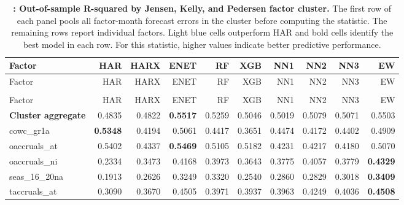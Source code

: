 \begingroup\scriptsize
\captionsetup{justification=raggedright,labelsep=none,singlelinecheck=false,labelformat=boldlabel}
\setlength{\tabcolsep}{2.5pt}
\begin{longtable}{>{\raggedright\arraybackslash}p{2.6cm}rrrrrrrrr}
\caption[Out-of-sample R-squared by Jensen, Kelly, and Pedersen factor cluster.]{\footnotesize \textbf{: Out-of-sample R-squared by Jensen, Kelly, and Pedersen factor cluster.} The first row of each panel pools all factor-month forecast errors in the cluster before computing the statistic. The remaining rows report individual factors. Light blue cells outperform HAR and bold cells identify the best model in each row. For this statistic, higher values indicate better predictive performance.}\label{tab:rv-factor_rss}\\
\hline
Factor & HAR & HARX & ENET & RF & XGB & NN1 & NN2 & NN3 & EW \\
\hline\endfirsthead
\hline
Factor & HAR & HARX & ENET & RF & XGB & NN1 & NN2 & NN3 & EW \\
\hline\endhead
\hline\endfoot
\multicolumn{10}{@{}l}{\textit{Panel A. Accruals}} \\
\hline
Factor & HAR & HARX & ENET & RF & XGB & NN1 & NN2 & NN3 & EW \\
\hline
\textbf{Cluster aggregate} & 0.4835 & 0.4822 & \textbf{\cellcolor{blue!10}0.5517} & \cellcolor{blue!10}0.5259 & \cellcolor{blue!10}0.5046 & \cellcolor{blue!10}0.5019 & \cellcolor{blue!10}0.5079 & \cellcolor{blue!10}0.5071 & \cellcolor{blue!10}0.5503 \\
cowc\_gr1a & \textbf{0.5348} & 0.4194 & 0.5061 & 0.4417 & 0.3651 & 0.4474 & 0.4172 & 0.4402 & 0.4909 \\
oaccruals\_at & 0.5402 & 0.4337 & \textbf{\cellcolor{blue!10}0.5469} & 0.5105 & 0.5182 & 0.4231 & 0.4217 & 0.4180 & 0.5070 \\
oaccruals\_ni & 0.2334 & \cellcolor{blue!10}0.3473 & \cellcolor{blue!10}0.4168 & \cellcolor{blue!10}0.3973 & \cellcolor{blue!10}0.3643 & \cellcolor{blue!10}0.3775 & \cellcolor{blue!10}0.4057 & \cellcolor{blue!10}0.3779 & \textbf{\cellcolor{blue!10}0.4329} \\
seas\_16\_20na & 0.1913 & \cellcolor{blue!10}0.2626 & \cellcolor{blue!10}0.3249 & \cellcolor{blue!10}0.3320 & \cellcolor{blue!10}0.2540 & \cellcolor{blue!10}0.2860 & \cellcolor{blue!10}0.2829 & \cellcolor{blue!10}0.3018 & \textbf{\cellcolor{blue!10}0.3409} \\
taccruals\_at & 0.3090 & \cellcolor{blue!10}0.3670 & \cellcolor{blue!10}0.4505 & \cellcolor{blue!10}0.3971 & \cellcolor{blue!10}0.3937 & \cellcolor{blue!10}0.3963 & \cellcolor{blue!10}0.4249 & \cellcolor{blue!10}0.4036 & \textbf{\cellcolor{blue!10}0.4508} \\

\end{longtable}
